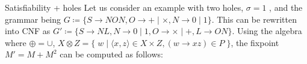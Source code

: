 \documentclass{beamer}
\newcommand\hole{\underline{\hspace{0.25cm}}}
\begin{document}
\begin{frame}[fragile]{Satisfiability + holes}
  Let us consider an example with two holes, $\sigma = 1$ \hole\phantom{.}\hole, and the grammar being $G\coloneqq\{S\rightarrow N O N, O \rightarrow + \mid \times, N \rightarrow 0 \mid 1\}$. This can be rewritten into CNF as $G'\coloneqq \{S \rightarrow N L, N \rightarrow 0 \mid 1, O \rightarrow × \mid +, L \rightarrow O N\}$. Using the algebra where $\oplus=\cup$, $X \otimes Z = \big\{\;w \mid \langle x, z\rangle \in X \times Z, (w\rightarrow xz) \in P\;\big\}$, the fixpoint $M' = M + M^2$ can be computed as follows:\\\vspace{10pt}

\end{frame}
\end{document}
